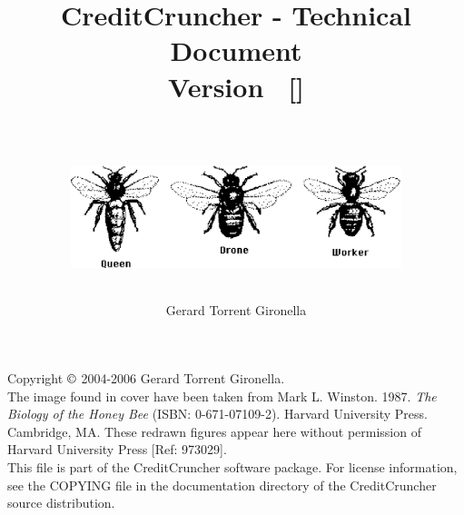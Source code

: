 
%
%
%
%
%
%
%
%
%

\title{CreditCruncher - Technical Document \\
Version \numversion\ {\small[\svnversion]}\\
\ \\
\centerline{\includegraphics[height=3cm, angle=0]{./images/threebees.eps}}
}

\author{Gerard Torrent Gironella}

\maketitle

\thispagestyle{empty}

\newpage

\vspace*{6in}

\noindent Copyright $\copyright$ 2004-2006 Gerard Torrent Gironella.\\

\noindent The image found in cover have been taken from Mark L. Winston. 1987.
\emph{The Biology of the Honey Bee} (ISBN: 0-671-07109-2). Harvard University
Press. Cambridge, MA. These redrawn figures appear here without permission of
Harvard University Press [Ref: 973029].\\

\noindent This file is part of the CreditCruncher software package.  For
license information, see the COPYING file in the documentation directory
of the CreditCruncher source distribution.
